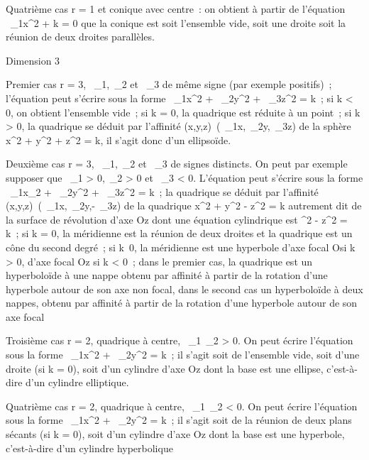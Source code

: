 \documentclass[]{article}
\begin{document}
Quatrième cas r = 1 et conique avec centre~: on obtient à partir de
l'équation \lambda~\_1x^2 + k = 0 que la conique est soit
l'ensemble vide, soit une droite soit la réunion de deux droites
parallèles.

Dimension 3

Premier cas r = 3, \lambda~\_1,\lambda~\_2 et \lambda~\_3 de même
signe (par exemple positifs)~; l'équation peut s'écrire sous la forme
\lambda~\_1x^2 + \lambda~\_2y^2 +
\lambda~\_3z^2 = k~; si k \textless{} 0, on obtient
l'ensemble vide~; si k = 0, la quadrique est réduite à un point~; si k
\textgreater{} 0, la quadrique se déduit par l'affinité
(x,y,z)\mapsto~(\sqrt\lambda~\_1x,\sqrt\lambda~\_2y,\sqrt\lambda~\_3z)
de la sphère x^2 + y^2 + z^2 = k, il
s'agit donc d'un ellipsoïde.

Deuxième cas r = 3, \lambda~\_1,\lambda~\_2 et \lambda~\_3 de signes
distincts. On peut par exemple supposer que \lambda~\_1 \textgreater{}
0,\lambda~\_2 \textgreater{} 0 et \lambda~\_3 \textless{} 0.
L'équation peut s'écrire sous la forme \lambda~\_1x\_2 +
\lambda~\_2y^2 + \lambda~\_3z^2 = k~; la
quadrique se déduit par l'affinité
(x,y,z)\mapsto~(\sqrt\lambda~\_1x,\sqrt\lambda~\_2y,\sqrt-\lambda~\_3z)
de la quadrique x^2 + y^2 - z^2 = k
autrement dit de la surface de révolution d'axe Oz dont une équation
cylindrique est \rho^2 - z^2 = k~; si k = 0, la
méridienne est la réunion de deux droites et la quadrique est un cône du
second degré~; si k\neq~0, la méridienne est une
hyperbole d'axe focal O\rho si k \textgreater{} 0, d'axe focal Oz si k
\textless{} 0~; dans le premier cas, la quadrique est un hyperboloïde à
une nappe obtenu par affinité à partir de la rotation d'une hyperbole
autour de son axe non focal, dans le second cas un hyperboloïde à deux
nappes, obtenu par affinité à partir de la rotation d'une hyperbole
autour de son axe focal

Troisième cas r = 2, quadrique à centre, \lambda~\_1\lambda~\_2
\textgreater{} 0. On peut écrire l'équation sous la forme
\lambda~\_1x^2 + \lambda~\_2y^2 = k~; il s'agit
soit de l'ensemble vide, soit d'une droite (si k = 0), soit d'un
cylindre d'axe Oz dont la base est une ellipse, c'est-à-dire d'un
cylindre elliptique.

Quatrième cas r = 2, quadrique à centre, \lambda~\_1\lambda~\_2
\textless{} 0. On peut écrire l'équation sous la forme
\lambda~\_1x^2 + \lambda~\_2y^2 = k~; il s'agit
soit de la réunion de deux plans sécants (si k = 0), soit d'un cylindre
d'axe Oz dont la base est une hyperbole, c'est-à-dire d'un cylindre
hyperbolique
\end{document}
